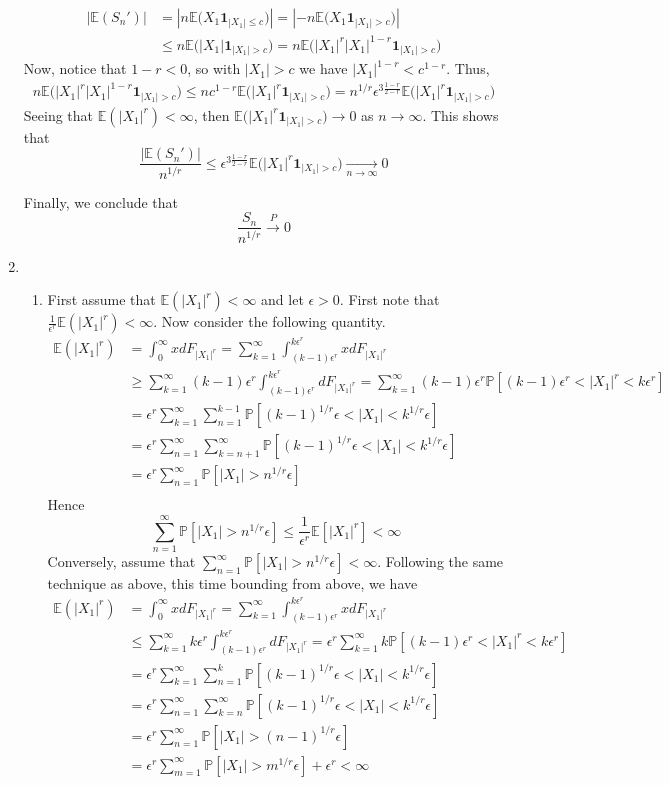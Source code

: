 \documentclass[12pt]{article}  %
\newcommand{\e}{{\epsilon}}
\newcommand{\E}{{\mathbb{E}}}
\newcommand{\prob}{{\mathbb{P}}}
\newcommand{\ind}{{\mathbf{1}}}
\begin{document}
\begin{enumerate}
\begin{align*}
|\E(S_n')| & = |n\E\Big(X_1\ind_{|X_1|\leq c}\Big)| = |-n\E\Big(X_1\ind_{|X_1|>c}\Big)|\\
&\leq n\E\Big(|X_1|\ind_{|X_1|>c}\Big) = n\E\Big(|X_1|^r|X_1|^{1-r}\ind_{|X_1|>c}\Big)
\end{align*}
Now, notice that $1-r<0$, so with $|X_1|>c$ we have $|X_1|^{1-r}<c^{1-r}$. Thus, 
\begin{align*}
n\E\Big(|X_1|^r|X_1|^{1-r}\ind_{|X_1|>c}\Big) \leq nc^{1-r}\E\Big(|X_1|^r\ind_{|X_1|>c}\Big) = n^{1/r}\e^{3\frac{1-r}{2-r}}\E\Big(|X_1|^r\ind_{|X_1|>c}\Big)
\end{align*}
Seeing that $\E(|X_1|^r)<\infty$, then $\E\Big(|X_1|^r\ind_{|X_1|>c}\Big)\to 0$ as $n\to\infty$. This shows that $$\frac{|\E(S_n')|}{n^{1/r}}\leq \e^{3\frac{1-r}{2-r}}\E\Big(|X_1|^r\ind_{|X_1|>c}\Big)\underset{n\to\infty}{\longrightarrow} 0$$

Finally, we conclude that $$\frac{S_n}{n^{1/r}}\overset{P}{\longrightarrow} 0$$

\item 
\begin{enumerate}
\item First assume that $\E(|X_1|^r)<\infty$ and let $\e>0$. First note that $\frac{1}{\e^r}\E(|X_1|^r)<\infty$. Now consider the following quantity. 
\begin{align*}
\E(|X_1|^r) &= \int_{0}^{\infty}xdF_{|X_1|^r} = \sum_{k = 1}^{\infty}\int_{(k-1)\e^r}^{k\e^r}xdF_{|X_1|^r}\\
&\geq \sum_{k=1}^{\infty}(k-1)\e^r\int_{(k-1)\e^r}^{k\e^r}dF_{|X_1|^r} = \sum_{k=1}^{\infty}(k-1)\e^r\prob[(k-1)\e^r< |X_1|^r< k\e^{r}]\\
&= \e^r\sum_{k=1}^{\infty}\sum_{n=1}^{k-1}\prob[(k-1)^{1/r}\e< |X_1|< k^{1/r}\e]\\
&= \e^r\sum_{n=1}^{\infty}\sum_{k=n+1}^{\infty}\prob[(k-1)^{1/r}\e< |X_1|< k^{1/r}\e]\\
&= \e^r\sum_{n=1}^{\infty}\prob[|X_1|>n^{1/r}\e]\\
\end{align*}
Hence $$\sum_{n=1}^{\infty}\prob[|X_1|>n^{1/r}\e] \leq \frac{1}{\e^r}\E[|X_1|^r]<\infty$$ 
Conversely, assume that $\sum_{n=1}^{\infty}\prob[|X_1|>n^{1/r}\e]<\infty$. Following the same technique as above, this time bounding from above, we have 
\begin{align*}
\E(|X_1|^r) &= \int_{0}^{\infty}xdF_{|X_1|^r} = \sum_{k = 1}^{\infty}\int_{(k-1)\e^r}^{k\e^r}xdF_{|X_1|^r}\\
&\leq \sum_{k=1}^{\infty}k\e^r\int_{(k-1)\e^r}^{k\e^r}dF_{|X_1|^r} = \e^r\sum_{k=1}^{\infty}k\prob[(k-1)\e^r< |X_1|^r< k\e^{r}]\\
&= \e^r\sum_{k=1}^{\infty}\sum_{n=1}^{k}\prob[(k-1)^{1/r}\e< |X_1|< k^{1/r}\e]\\
&= \e^r\sum_{n=1}^{\infty}\sum_{k=n}^{\infty}\prob[(k-1)^{1/r}\e< |X_1|< k^{1/r}\e]\\
&= \e^r\sum_{n=1}^{\infty}\prob[|X_1|>(n-1)^{1/r}\e]\\
&= \e^r\sum_{m=1}^{\infty}\prob[|X_1|>m^{1/r}\e] + \e^r<\infty\\
\end{align*}


\end{enumerate}
\end{enumerate}
\end{document}
